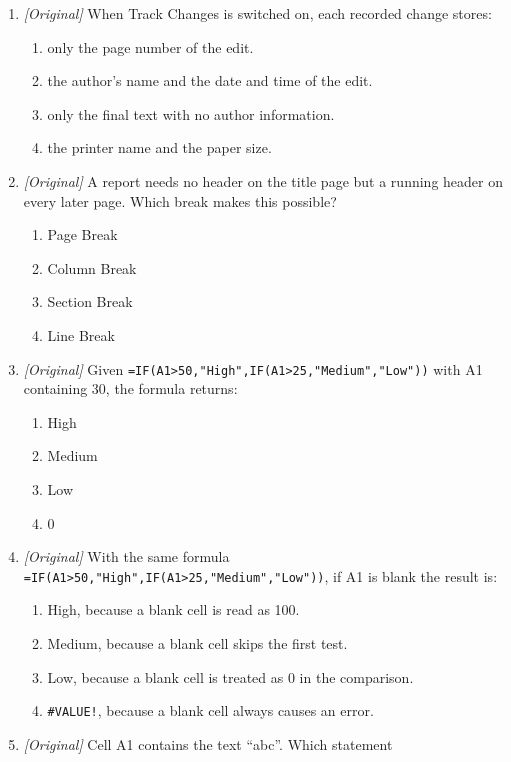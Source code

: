 \begin{enumerate}[label=\textbf{Q\arabic*.}, leftmargin=*]
\begin{enumerate}[label=\Alph*.]
    \item Insert, Design, References
  \end{enumerate}
\item \textit{[Original]} When Track Changes is switched on, each recorded
  change stores:
  \begin{enumerate}[label=\Alph*.]
    \item only the page number of the edit.
    \item the author's name and the date and time of the edit.
    \item only the final text with no author information.
    \item the printer name and the paper size.
  \end{enumerate}
\item \textit{[Original]} A report needs no header on the title page but a
  running header on every later page. Which break makes this possible?
  \begin{enumerate}[label=\Alph*.]
    \item Page Break
    \item Column Break
    \item Section Break
    \item Line Break
  \end{enumerate}
\item \textit{[Original]} Given
  \texttt{=IF(A1>50,"High",IF(A1>25,"Medium","Low"))} with A1 containing 30,
  the formula returns:
  \begin{enumerate}[label=\Alph*.]
    \item High
    \item Medium
    \item Low
    \item 0
  \end{enumerate}
\item \textit{[Original]} With the same formula
  \texttt{=IF(A1>50,"High",IF(A1>25,"Medium","Low"))}, if A1 is blank the
  result is:
  \begin{enumerate}[label=\Alph*.]
    \item High, because a blank cell is read as 100.
    \item Medium, because a blank cell skips the first test.
    \item Low, because a blank cell is treated as 0 in the comparison.
    \item \texttt{\#VALUE!}, because a blank cell always causes an error.
  \end{enumerate}
\item \textit{[Original]} Cell A1 contains the text ``abc''. Which statement

\end{enumerate}
